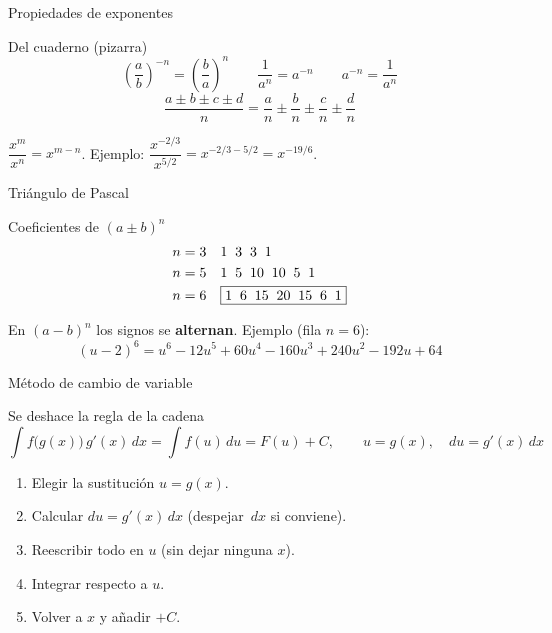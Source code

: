 \documentclass[aspectratio=169]{beamer}
\newcommand{\dx}{\,dx}
\newcommand{\du}{\,du}
\begin{document}
\begin{frame}{Propiedades de exponentes}
  \begin{block}{Del cuaderno (pizarra)}
    \[
      \left(\frac{a}{b}\right)^{-n}=\left(\frac{b}{a}\right)^{n}
      \qquad
      \frac{1}{a^{n}}=a^{-n}
      \qquad
      a^{-n}=\frac{1}{a^{n}}
    \]
    \[
      \frac{a\pm b\pm c\pm d}{n}=\frac{a}{n}\pm\frac{b}{n}\pm\frac{c}{n}\pm\frac{d}{n}
    \]
  \end{block}
  \vspace{2pt}
  \begin{mwpasos}
    $\dfrac{x^{m}}{x^{n}} = x^{m-n}$.
    Ejemplo: $\dfrac{x^{-2/3}}{x^{5/2}} = x^{-2/3-5/2} = x^{-19/6}$.
  \end{mwpasos}
\end{frame}

\begin{frame}{Triángulo de Pascal}
  \begin{block}{Coeficientes de $(a\pm b)^{n}$}
    \[
      \begin{array}{c@{\quad}l}
        n=3 & 1\;\;3\;\;3\;\;1\\[3pt]
        n=5 & 1\;\;5\;\;10\;\;10\;\;5\;\;1\\[3pt]
        n=6 & \boxed{1\;\;6\;\;15\;\;20\;\;15\;\;6\;\;1}
      \end{array}
    \]
  \end{block}
  \vspace{2pt}
  \begin{mwextra}
    En $(a-b)^{n}$ los signos se \textbf{alternan}. Ejemplo (fila $n=6$):
    \[
      (u-2)^{6}=u^{6}-12u^{5}+60u^{4}-160u^{3}+240u^{2}-192u+64
    \]
  \end{mwextra}
\end{frame}

\begin{frame}{Método de cambio de variable}
  \begin{block}{Se deshace la regla de la cadena}
    \[
      \int f\bigl(g(x)\bigr)\,g'(x)\dx = \int f(u)\du = F(u)+C,
      \qquad u=g(x),\quad du=g'(x)\dx
    \]
  \end{block}
  \vspace{2pt}
  \begin{mwpasos}
    \begin{enumerate}
      \item Elegir la sustitución $u=g(x)$.
      \item Calcular $du=g'(x)\dx$ (despejar $\dx$ si conviene).
      \item Reescribir todo en $u$ (sin dejar ninguna $x$).
      \item Integrar respecto a $u$.
      \item Volver a $x$ y añadir $+C$.
    \end{enumerate}
  \end{mwpasos}
\end{frame}
\end{document}
